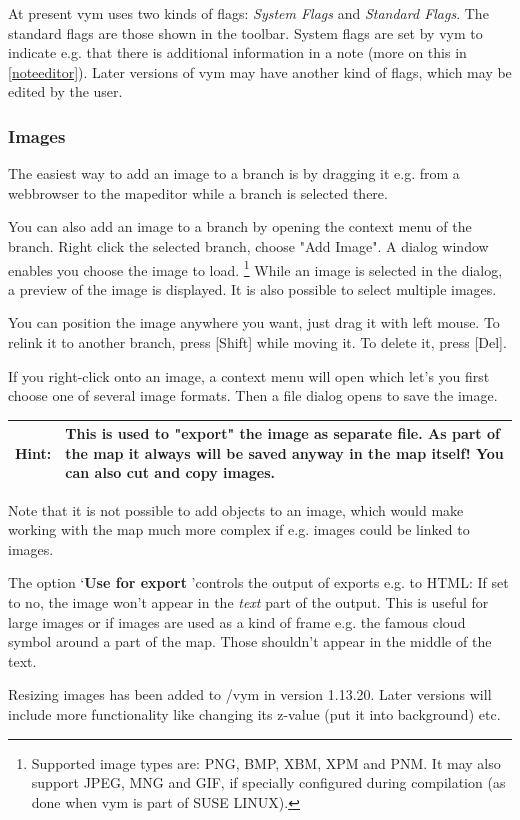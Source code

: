 \documentclass[12pt,a4paper]{article}
\newcommand{\hint}[1]{
    \begin{center} 
        \begin{tabular}{|rp{12cm}|} \hline
            {\bf Hint}:& #1\\   \hline
        \end{tabular}
            \marginpar{\Huge !} 
    \end{center} 
}
\newcommand{\vym}{{\sc vym }}
\newcommand{\key}[1]{[#1]}
\begin{document}
At present \vym uses two kinds of flags: {\em System Flags} and {\em
Standard Flags}. The standard flags are those shown in the toolbar.
System flags are set by \vym to indicate e.g. that there is additional
information in a note (more on this in \ref{noteeditor}). Later versions
of \vym may have another kind of flags, which may be edited by the user.

\subsubsection*{Images}
The easiest way to add an image to a branch is by dragging it e.g. from a
webbrowser to the mapeditor while a branch is selected there.

You can also add an image to a branch by opening the context menu of the
branch. Right click the selected branch, choose "Add Image". A dialog
window enables you choose the image to load. 
\footnote{Supported image types are: PNG, BMP, XBM, XPM and PNM. It may
    also support JPEG, MNG and GIF, if specially configured during
    compilation (as done when \vym is part of SUSE LINUX).}
While an image is selected in the dialog, a preview of the image is
displayed. It is also possible to select multiple images.  

You can position the image anywhere you want, just drag it with left
mouse. To relink it to another branch, press \key{Shift} while moving
it. To delete it, press \key{Del}. 

If you right-click onto an image, a context menu will open which let's
you first choose one of several image formats. Then a file dialog opens
to save the image. 

\hint{ This is used to "export" the image as separate file. As part of
the map it always will be
saved anyway in the map itself! You can also cut and
copy images.}
Note that it is not possible to add objects to an image, which would
make working with the map much more complex if e.g. images could be
linked to images.

The option \lq{\bf Use for export} \rq controls the output of exports
e.g. to HTML: If set to no, the image won't appear in the {\em text}
part of the output. This is useful for large images or if images are
used as a kind of frame e.g. the famous cloud symbol around a part of
the map. Those shouldn't appear in the middle of the text.

Resizing images has been added to /vym in version 1.13.20. Later
versions will include more functionality like 
changing its z-value (put it into background) etc.
\end{document}
